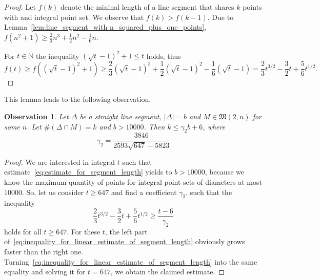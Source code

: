 \documentclass[a4paper,14pt]{article} %
\theoremstyle{plain}
\newtheorem{observation}[theorem]{Observation}
\theoremstyle{definition}
\begin{document}
\begin{proof}
	Let $f(k)$ denote the mininal length of a line segment
	that shares $k$ points with and integral point set.
	We observe that $f(k) > f (k-1)$.
	Due to Lemma~\ref{lem:line_segment_with n_squared_plus_one_points},
	$f(n^2+1) \geq \frac{2}{3}n^3+\frac{1}{2}n^2-\frac{1}{6}n$.

	For $t\in\mathbb{N}$ the inequality $(\sqrt{t} - 1)^2 +1 \leq t$ holds,
	thus
	\begin{equation}
		\label{eq:line_segment_length}
		f(t) \geq f((\sqrt{t} - 1)^2 +1) \geq \frac{2}{3}(\sqrt{t} - 1)^3+\frac{1}{2}(\sqrt{t} - 1)^2-\frac{1}{6}(\sqrt{t} - 1)
		=
		\frac{2}{3}t^{3/2}-\frac{3}{2}t+\frac{5 }{6}t^{1/2}
		.
	\end{equation}
\end{proof}

This lemma leads to the following observation.

\begin{observation}
	\label{obs:estimate_points_on_straight_line}
	Let $\Delta$ be a straight line segment, $|\Delta| = b$ and $M \in \mathfrak{M}(2,n)$ for some $n$.
	Let $\#(\Delta \cap M) = k$ and $b>10000$.
	Then $k \leq \gamma_2 b + 6$,
	where
	\begin{equation}
		\gamma_2 = \frac{3846}{2593 \sqrt{647}-5823}
	\end{equation}
\end{observation}

\begin{proof}
	We are interested in integral $t$ such that estimate~\eqref{eq:estimate_for_segment_length}
	yields to $b > 10000$, because we know the maximum quantity of points for integral point sets of diameters at most $10000$.
	So, let us consider $t\geq 647$ and find a coefficient $\gamma_2$,
	such that the inequality
	\begin{equation}
		\label{eq:inequality_for_linear_estimate_of_segment_length}
		\frac{2}{3}t^{3/2}-\frac{3}{2}t+\frac{5 }{6}t^{1/2} \geq \frac{t-6}{\gamma_2}
	\end{equation}
	holds for all $t\geq 647$.
	For these $t$,
	the left part of~\eqref{eq:inequality_for_linear_estimate_of_segment_length} obviously grows faster than the right one.
	Turning~\eqref{eq:inequality_for_linear_estimate_of_segment_length} into the same equality
	and solving it for $t=647$, we obtain the claimed estimate.
\end{proof}
\end{document}
